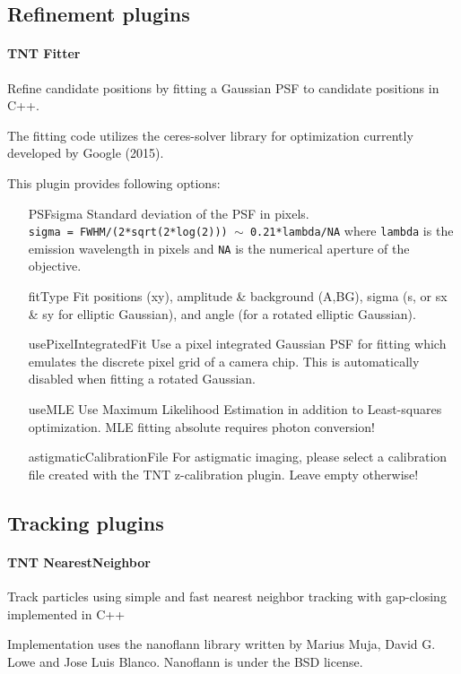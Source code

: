 \documentclass[11pt,onside]{report}
\numberwithin{equation}{chapter}
\begin{document}
\subsection{Refinement plugins}
\paragraph{TNT Fitter}
Refine candidate positions by fitting a Gaussian PSF to candidate positions in C++.

The fitting code utilizes the ceres-solver library for optimization currently developed by Google (2015).

This plugin provides following options:
\begin{itemize}[leftmargin=3cm]
	\item[\textsf{PSFsigma}] Standard deviation of the PSF in pixels.\\	
		\texttt{sigma = FWHM/(2*sqrt(2*log(2))) $\sim$ 0.21*lambda/NA} where \texttt{lambda} is the emission wavelength in pixels and \texttt{NA} is the numerical aperture of the objective.
	\item[\textsf{fitType}] Fit positions (xy), amplitude \& background (A,BG), sigma (s, or sx \& sy for elliptic Gaussian), and angle (for a rotated elliptic Gaussian).
	\item[\textsf{usePixelIntegratedFit}] Use a pixel integrated Gaussian PSF for fitting which emulates the discrete pixel grid of a camera chip. This is automatically disabled when fitting a rotated Gaussian.
	\item[\textsf{useMLE}] Use Maximum Likelihood Estimation in addition to Least-squares optimization. MLE fitting absolute requires photon conversion!
	\item[\textsf{astigmaticCalibrationFile}] For astigmatic imaging, please select a calibration file created with  the \textsf{TNT z-calibration} plugin. Leave empty otherwise!
\end{itemize}
\subsection{Tracking plugins}
\paragraph{TNT NearestNeighbor}
Track particles using simple and fast nearest neighbor tracking with gap-closing implemented in C++

Implementation uses the nanoflann library written by Marius Muja, David G. Lowe and Jose Luis Blanco. Nanoflann is under the BSD license.
\end{document}
